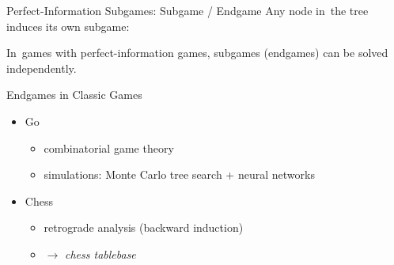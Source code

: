 \documentclass{beamer}
\theoremstyle{definition}
\begin{document}
  \begin{frame}{Perfect-Information Subgames: Subgame / Endgame}
    Any node in~the tree induces its own subgame:
    \pause
    \begin{figure}[H]
      \raggedleft
      \scriptsize
      \def\svgwidth{.8\textwidth}
      
    \end{figure}
    \pause

    In~games with perfect-information games, subgames (endgames) can be solved independently.
  \end{frame}

  \begin{frame}{Endgames in Classic Games}
    \pause
    \begin{itemize}[<+- | alert@+>]
      \item Go
        \begin{itemize}
          \item combinatorial game theory
          \item simulations: Monte Carlo tree search + neural networks
        \end{itemize}
      \item Chess
        \begin{itemize}
          \item retrograde analysis (backward induction)
          \item $\to$ \emph{chess tablebase}
        \end{itemize}
    \end{itemize}
  \end{frame}
\end{document}
